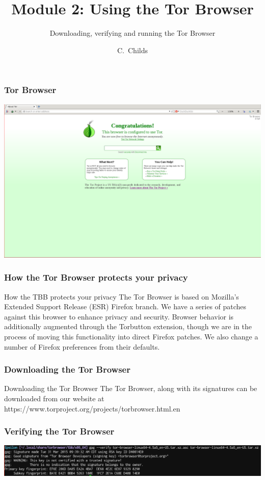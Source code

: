 \documentclass{beamer}
\title[Module 2: Tor Browser]
{Module 2: Using the Tor Browser}
\subtitle{Downloading, verifying and running the Tor Browser}
\author[C. Childs]
{C.~Childs\inst{1}}
\institute[Tor Project]
{
  \inst{1}
  Support assistant / Translation coordinator\\
  The Tor Project
}
\begin{document}
\frame{\titlepage}

\begin{frame}
	\frametitle{Tor Browser}
	\begin{center}
		\includegraphics[width= \paperwidth]{shots/generic/browser.png}
	\end{center}
\end{frame}

\begin{frame}
\frametitle{How the Tor Browser protects your privacy}
	\begin{block}{How the TBB protects your privacy}
The Tor Browser is based on Mozilla's Extended Support Release (ESR) Firefox branch. We have a series of patches against this browser to enhance privacy and security. Browser behavior is additionally augmented through the Torbutton extension, though we are in the process of moving this functionality into direct Firefox patches. We also change a number of Firefox preferences from their defaults.
	\end{block}
\end{frame}

\begin{frame}
\frametitle{Downloading the Tor Browser}
        \begin{block}{Downloading the Tor Browser}
The Tor Browser, along with its signatures can be downloaded from our website at https://www.torproject.org/projects/torbrowser.html.en
        \end{block}
\end{frame}

\begin{frame}
\frametitle{Verifying the Tor Browser}
        \begin{center}
                \includegraphics[width= \paperwidth]{shots/linux/verify.png}
        \end{center}
\end{frame}
\end{document}
